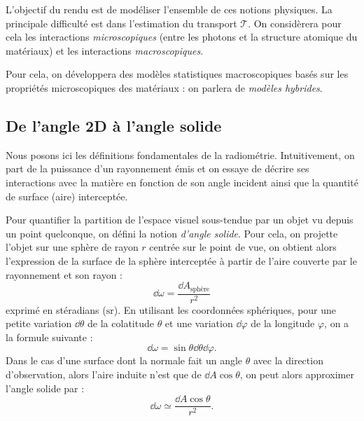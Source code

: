 L'objectif du rendu est de modéliser l'ensemble de ces notions physiques. La principale difficulté est dans l'estimation du transport $ \mathcal{T}$. On considèrera pour cela les interactions \emph{microscopiques} (entre les photons et la structure atomique du matériaux) et les interactions \emph{macroscopiques}. 

Pour cela, on développera des modèles statistiques macroscopiques basés sur les propriétés microscopiques des matériaux : on parlera de \emph{modèles hybrides}. 

\subsection{De l'angle 2D à l'angle solide}

Nous posons ici les définitions fondamentales de la radiométrie. Intuitivement, on part de la puissance d'un rayonnement émis et on essaye de décrire ses interactions avec la matière en fonction de son angle incident ainsi que la quantité de surface (aire) interceptée. 

\begin{definition}
    Pour quantifier la partition de l'espace visuel sous-tendue par un objet vu depuis un point quelconque, on défini la notion \emph{d'angle solide}. 
    Pour cela, on projette l'objet sur une sphère de rayon $r$ centrée sur le point de vue, on obtient alors l'expression de la surface de la sphère interceptée à partir de l'aire couverte par le rayonnement et son rayon : 
    \begin{equation}
        \dd \omega = \frac{ \dd A_{\text{sphère}}}{r^2}
    \end{equation}
    exprimé en stéradians ($ \mathrm{sr}$). En utilisant les coordonnées sphériques, pour une petite variation $\dd \theta$ de la colatitude $ \theta$ et une variation $ \dd \varphi$ de la longitude $ \varphi$, on a la formule suivante : 
    \begin{equation}
        \dd \omega = \sin \theta \dd \theta \dd \varphi. 
    \end{equation} 
    Dans le cas d'une surface dont la normale fait un angle $ \theta$ avec la direction d'observation, alors l'aire induite n'est que de $ \dd A \cos \theta$, on peut alors approximer l'angle solide par : 
    \begin{equation}
        \dd \omega \simeq \frac{\dd A \cos \theta}{r^2}. 
    \end{equation}
\end{definition}

